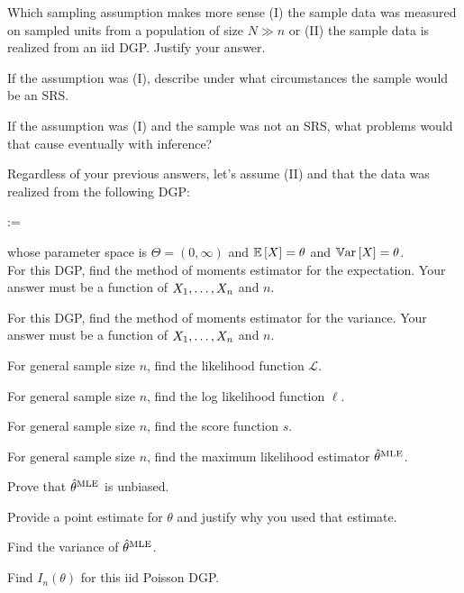 \documentclass[12pt]{article}
\begin{document}
\begin{enumerate}[(a)]

 Which sampling assumption makes more sense (I) the sample data was measured on sampled units from a population of size $N \gg n$ or (II) the sample data is realized from an iid DGP. Justify your answer.

 If the assumption was (I), describe under what circumstances the sample would be an SRS. 

 If the assumption was (I) and the sample was not an SRS, what problems would that cause eventually with inference? 

 Regardless of your previous answers, let's assume (II) and that the data was
realized from the following DGP:

\beqn
\Xoneton \iid \poisson{\theta} :=   
\eeqn

\noindent whose parameter space is $\Theta = (0, \infty)$ and $\mathbb{E}\left[X\right] = \theta$ and $\mathbb{V}\text{ar}\left[X\right] = \theta$. \\

For this DGP, find the method of moments estimator for the expectation. Your answer must be a function of $X_1, \ldots, X_n$ and $n$. 

 For this DGP, find the method of moments estimator for the variance. Your answer must be a function of $X_1, \ldots, X_n$ and $n$. 

 For general sample size $n$, find the likelihood function $\mathcal{L}$.

 For general sample size $n$, find the log likelihood function $\ell$.

 For general sample size $n$, find the score function $s$.

 For general sample size $n$, find the maximum likelihood estimator $\hat{\theta}^{\mathrm{MLE}}$.


 Prove that $\hat{\theta}^{\mathrm{MLE}}$ is unbiased.

 Provide a point estimate for $\theta$ and justify why you used that estimate.

 Find the variance of $\hat{\theta}^{\mathrm{MLE}}$.

 Find $I_n(\theta)$ for this iid Poisson DGP.


\end{enumerate}
\end{document}
